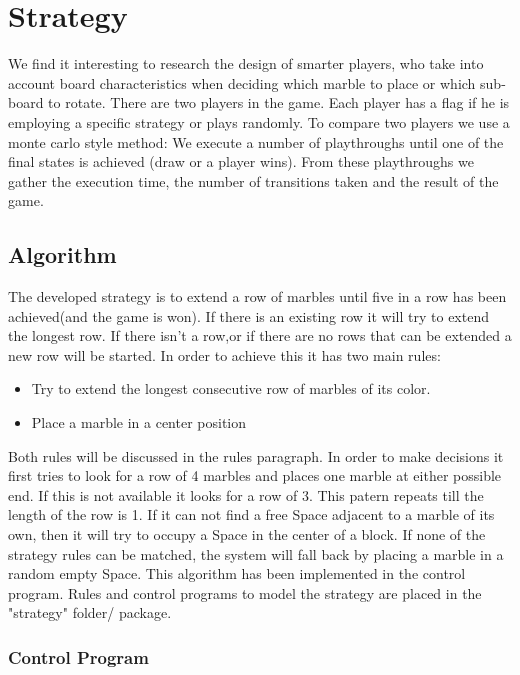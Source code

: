 \section{Strategy}
\label{Strategy}
We find it interesting to research the design of smarter players, who take into account board characteristics when deciding which marble to place or which sub-board to rotate.
There are two players in the game. Each player has a flag if he is employing a specific strategy or plays randomly. 
To compare two players we use a monte carlo style method: We execute a number of playthroughs until one of the final states is achieved (draw or a player wins).
From these playthroughs we gather the execution time, the number of transitions taken and the result of the game.

\vspace{6pt}
\subsection{Algorithm}
The developed strategy is to extend a row of marbles until five in a row has been achieved(and the game is won).
If there is an existing row it will try to extend the longest row.
If there isn't a row,or if there are no rows that can be extended a new row will be started.
 In order to achieve this it has two main rules:
\begin{itemize}
\item Try to extend the longest consecutive row of marbles of its color.
\item Place a marble in a center position
\end{itemize}
Both rules will be discussed in the rules paragraph.
In order to make decisions it first tries to look for a row of 4 marbles and places one marble at either possible end. If this is not available it looks for a row of 3. This patern repeats till the length of the row is 1.
If it can not find a free Space adjacent to a marble of its own, then it will try to occupy a Space in the center of a block.
If none of the strategy rules can be matched, the system will fall back by placing a marble in a random empty Space.
This algorithm has been implemented in the control program.
Rules and control programs to model the strategy are placed in the "strategy" folder/ package.

\subsubsection{Control Program}

